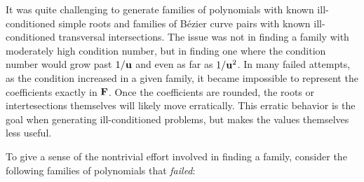 It was quite challenging to generate families of polynomials with known
ill-conditioned simple roots and families of B\'{e}zier curve pairs with known
ill-conditioned transversal intersections. The issue was not in finding a
family with moderately high condition number, but in finding one where the
condition number would grow past \(1 / \mathbf{u}\) and even as far as
\(1 / \mathbf{u}^2\). In many failed attempts, as the condition increased
in a given family, it became impossible to represent the
coefficients exactly in \(\mathbf{F}\). Once the coefficients are rounded,
the roots or intertesections themselves will likely move erratically.
This erratic behavior is the goal when generating ill-conditioned problems,
but makes the values themselves less useful.

To give a sense of the nontrivial effort involved in finding a
family, consider the following families of polynomials that
\emph{failed}:
